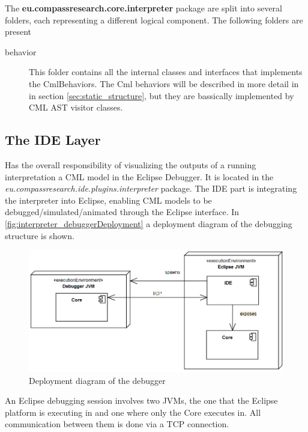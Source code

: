 \documentclass[a4paper, 10pt]{include/compassreport}   %
\begin{document}
The \textbf{eu.compassresearch.core.interpreter} package are split into several
folders, each representing a different logical component. The
following folders are present

\begin{description}
\item[behavior] This folder contains all the internal classes and
  interfaces that implements the CmlBehaviors. The Cml behaviors will be
  described in more detail in in section \ref{sec:static_structure}, but
  they are bassically implemented by CML AST visitor classes.
\end{description}

\subsection{The IDE Layer}

Has the overall responsibility of visualizing the outputs of a running
interpretation a CML model in the Eclipse Debugger. It is located in
the \emph{eu.compassresearch.ide.plugins.interpreter} package.  The
IDE part is integrating the interpreter into Eclipse, enabling CML
models to be debugged/simulated/animated through the Eclipse
interface. In \autoref{fig:interpreter_debuggerDeployment} a
deployment diagram of the debugging structure is shown.

\begin{figure}[ht!]
  \begin{center}
    \includegraphics[width=1\textwidth]{figures/DebuggerDeploymentView}
    \caption{Deployment diagram of the debugger}
    \label{fig:interpreter_debuggerDeployment}
   \end{center}
\end{figure}

An Eclipse debugging session involves two JVMs, the one that the Eclipse
platform is executing in and one where only the Core executes in. All
communication between them is done via a TCP connection. 
\end{document}

